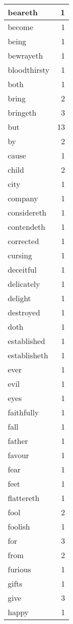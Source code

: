 \begin{center}
\begin{longtable}{l|r}
beareth & 1\\ \hline 
become & 1\\ \hline 
being & 1\\ \hline 
bewrayeth & 1\\ \hline 
bloodthirsty & 1\\ \hline 
both & 1\\ \hline 
bring & 2\\ \hline 
bringeth & 3\\ \hline 
but & 13\\ \hline 
by & 2\\ \hline 
cause & 1\\ \hline 
child & 2\\ \hline 
city & 1\\ \hline 
company & 1\\ \hline 
considereth & 1\\ \hline 
contendeth & 1\\ \hline 
corrected & 1\\ \hline 
cursing & 1\\ \hline 
deceitful & 1\\ \hline 
delicately & 1\\ \hline 
delight & 1\\ \hline 
destroyed & 1\\ \hline 
doth & 1\\ \hline 
established & 1\\ \hline 
establisheth & 1\\ \hline 
ever & 1\\ \hline 
evil & 1\\ \hline 
eyes & 1\\ \hline 
faithfully & 1\\ \hline 
fall & 1\\ \hline 
father & 1\\ \hline 
favour & 1\\ \hline 
fear & 1\\ \hline 
feet & 1\\ \hline 
flattereth & 1\\ \hline 
fool & 2\\ \hline 
foolish & 1\\ \hline 
for & 3\\ \hline 
from & 2\\ \hline 
furious & 1\\ \hline 
gifts & 1\\ \hline 
give & 3\\ \hline 
happy & 1\\ \hline 

\end{longtable}
\end{center}
